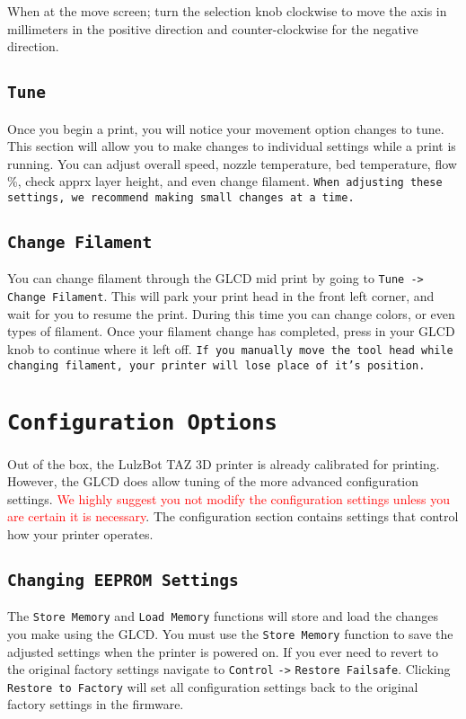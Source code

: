 When at the move screen; turn the selection knob clockwise to move the axis in millimeters in the positive direction and counter-clockwise for the negative direction. 

\subsection{\texttt{Tune}}
Once you begin a print, you will notice your movement option changes to tune. This section will allow you to make changes to individual settings while a print is running. You can adjust overall speed, nozzle temperature, bed temperature, flow \%, check apprx layer height, and even change filament. \texttt{When adjusting these settings, we recommend making small changes at a time.}

\subsection{\texttt{Change Filament}}
You can change filament through the GLCD mid print by going to \texttt{Tune -> Change Filament}. This will park your print head in the front left corner, and wait for you to resume the print. During this time you can change colors, or even types of filament. Once your filament change has completed, press in your GLCD knob to continue where it left off. \texttt{If you manually move the tool head while changing filament, your printer will lose place of it's position.}

\section{\texttt{Configuration Options}} 

Out of the box, the LulzBot TAZ 3D printer is already calibrated for printing. However, the GLCD does allow tuning of the more advanced configuration settings. \textcolor{red}{We highly suggest you not modify the configuration settings unless you are certain it is necessary}. The configuration section contains settings that control how your printer operates.

\subsection{\texttt{Changing EEPROM Settings}}
The \texttt{Store Memory} and \texttt{Load Memory} functions will store and load the changes you make using the GLCD. You must use the \texttt{Store Memory} function to save the adjusted settings when the printer is powered on. If you ever need to revert to the original factory settings navigate to \texttt{Control} \texttt{->} \texttt{Restore Failsafe}. Clicking \texttt{Restore to Factory} will set all configuration settings back to the original factory settings in the firmware.

